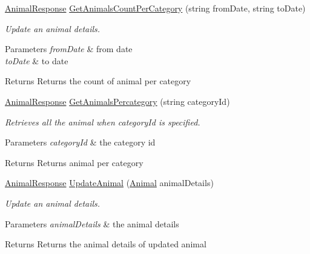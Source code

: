 \begin{DoxyCompactItemize}
\begin{DoxyCompactList}
\end{DoxyCompactList}\item 
\hyperlink{classWildLifeTracker_1_1Response_1_1AnimalResponse}{Animal\+Response} \hyperlink{interfaceWildLifeTracker_1_1Services_1_1IAnimalService_aa4dc53f849ee7b88879fa17f9d48bd42}{Get\+Animals\+Count\+Per\+Category} (string from\+Date, string to\+Date)
\begin{DoxyCompactList}\small\item\em Update an animal details. 
\begin{DoxyParams}{Parameters}
{\em from\+Date} & from date\\
\hline
{\em to\+Date} & to date\\
\hline
\end{DoxyParams}
\begin{DoxyReturn}{Returns}
Returns the count of animal per category
\end{DoxyReturn}
\end{DoxyCompactList}\item 
\hyperlink{classWildLifeTracker_1_1Response_1_1AnimalResponse}{Animal\+Response} \hyperlink{interfaceWildLifeTracker_1_1Services_1_1IAnimalService_aa701643cef16849a06696c926b87d46d}{Get\+Animals\+Percategory} (string category\+Id)
\begin{DoxyCompactList}\small\item\em Retrieves all the animal when category\+Id is specified. 
\begin{DoxyParams}{Parameters}
{\em category\+Id} & the category id\\
\hline
\end{DoxyParams}
\begin{DoxyReturn}{Returns}
Returns animal per category
\end{DoxyReturn}
\end{DoxyCompactList}\item 
\hyperlink{classWildLifeTracker_1_1Response_1_1AnimalResponse}{Animal\+Response} \hyperlink{interfaceWildLifeTracker_1_1Services_1_1IAnimalService_a993d3155da89897e5403799432be158b}{Update\+Animal} (\hyperlink{classWildLifeTracker_1_1Models_1_1Animal}{Animal} animal\+Details)
\begin{DoxyCompactList}\small\item\em Update an animal details. 
\begin{DoxyParams}{Parameters}
{\em animal\+Details} & the animal details\\
\hline
\end{DoxyParams}
\begin{DoxyReturn}{Returns}
Returns the animal details of updated animal
\end{DoxyReturn}
\end{DoxyCompactList}\end{DoxyCompactItemize}


